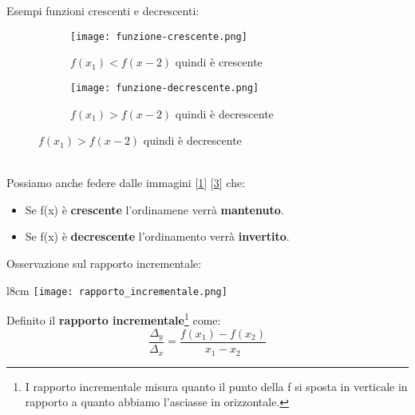 \begin{example}
    Esempi funzioni crescenti e decrescenti:\\
    \begin{figure}[h!]
        \begin{subfigure}{.5\textwidth}
            \centering
            \texttt{[image: funzione-crescente.png]}
            \caption{$f(x_1) < f(x-2)$ quindi è crescente}
            \label{fig:funzione-crescente}
        \end{subfigure}
        \begin{subfigure}{.5\textwidth}
            \centering
            \texttt{[image: funzione-decrescente.png]}
            \caption{$f(x_1) > f(x-2)$ quindi è decrescente}
            \label{fig:funzione-decrescente}
        \end{subfigure}
    \end{figure}
    \\Possiamo anche federe dalle immagini [\ref{fig:funzione-crescente}] [\ref{fig:funzione-decrescente}] che:
    \begin{itemize}
        \item Se f(x) è \textbf{crescente} l'ordinamene verrà \textbf{mantenuto}.
        \item Se f(x) è \textbf{decrescente} l'ordinamento verrà \textbf{invertito}.\\
    \end{itemize}
\end{example}

\begin{observation}
    Osservazione sul rapporto incrementale:\\
\end{observation}
\begin{wrapfigure}[8]{l}{8cm}
    \vspace{-15pt}
    \centering
    \texttt{[image: rapporto\_incrementale.png]}
    \caption{$\frac{\Delta_y}{\Delta_x}$}
    \label{fig:esempio-invertibilità}
\end{wrapfigure}
Definito il \textbf{rapporto incrementale}\footnote{I rapporto incrementale misura quanto il punto della f si sposta in verticale in rapporto a quanto abbiamo l'asciasse in orizzontale.} come:
\begin{equation}
    \frac{\Delta_y}{\Delta_x}=\frac{f(x_1) - f(x_2)}{x_1 - x_2}
\end{equation}


